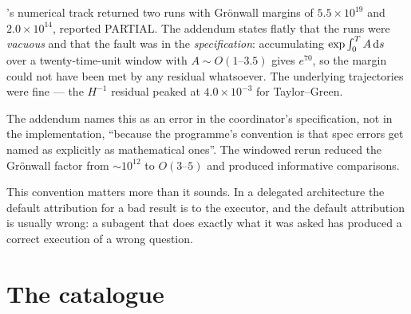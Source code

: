 's numerical track returned two runs with Gr\"onwall margins of
\(5.5\times10^{19}\) and \(2.0\times10^{14}\), reported \textsf{PARTIAL}. The
addendum states flatly that the runs were \emph{vacuous} and that the fault was
in the \emph{specification}: accumulating \(\exp\int_0^TA\,\mathrm{d} s\) over a
twenty-time-unit window with \(A\sim O(1\text{--}3.5)\) gives \(e^{70}\), so
the margin could not have been met by any residual whatsoever. The underlying
trajectories were fine --- the \(H^{-1}\) residual peaked at
\(4.0\times10^{-3}\) for Taylor--Green.

The addendum names this as an error in the coordinator's specification, not in
the implementation, ``because the programme's convention is that spec errors
get named as explicitly as mathematical ones''. The windowed rerun reduced the
Gr\"onwall factor from \(\sim10^{12}\) to \(O(3\text{--}5)\) and produced
informative comparisons.

This convention matters more than it sounds. In a delegated architecture the
default attribution for a bad result is to the executor, and the default
attribution is usually wrong: a subagent that does exactly what it was asked
has produced a correct execution of a wrong question.

\section{The catalogue}
\label{sec:catalogue}


